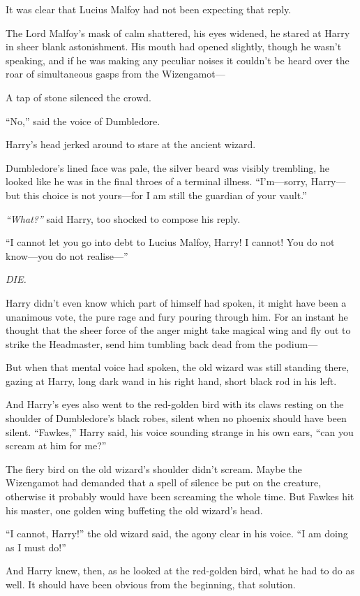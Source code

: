 It was clear that Lucius Malfoy had not been expecting that reply.

The Lord Malfoy's mask of calm shattered, his eyes widened, he stared at
Harry in sheer blank astonishment. His mouth had opened slightly, though
he wasn't speaking, and if he was making any peculiar noises it couldn't
be heard over the roar of simultaneous gasps from the Wizengamot---

A tap of stone silenced the crowd.

``No,'' said the voice of Dumbledore.

Harry's head jerked around to stare at the ancient wizard.

Dumbledore's lined face was pale, the silver beard was visibly
trembling, he looked like he was in the final throes of a terminal
illness. ``I'm---sorry, Harry---but this choice is not yours---for I am
still the guardian of your vault.''

\emph{``What?''} said Harry, too shocked to compose his reply.

``I cannot let you go into debt to Lucius Malfoy, Harry! I cannot! You
do not know---you do not realise---''

\emph{DIE.}

Harry didn't even know which part of himself had spoken, it might have
been a unanimous vote, the pure rage and fury pouring through him. For
an instant he thought that the sheer force of the anger might take
magical wing and fly out to strike the Headmaster, send him tumbling
back dead from the podium---

But when that mental voice had spoken, the old wizard was still standing
there, gazing at Harry, long dark wand in his right hand, short black
rod in his left.

And Harry's eyes also went to the red-golden bird with its claws resting
on the shoulder of Dumbledore's black robes, silent when no phoenix
should have been silent. ``Fawkes,'' Harry said, his voice sounding
strange in his own ears, ``can you scream at him for me?''

The fiery bird on the old wizard's shoulder didn't scream. Maybe the
Wizengamot had demanded that a spell of silence be put on the creature,
otherwise it probably would have been screaming the whole time. But
Fawkes hit his master, one golden wing buffeting the old wizard's head.

``I cannot, Harry!'' the old wizard said, the agony clear in his voice.
``I am doing as I must do!''

And Harry knew, then, as he looked at the red-golden bird, what he had
to do as well. It should have been obvious from the beginning, that
solution.

